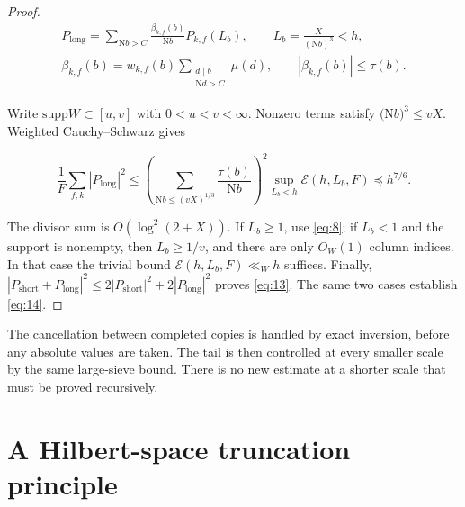 \documentclass[reqno,a4paper,11pt]{amsart}
\begin{document}
\begin{proof}
\begin{equation}\label{eq:16}
\begin{gathered} {P}_{\mathrm{long}}=\sum _{\mathrm{N}b>C} \frac{{\beta }_{k,f}\left( b\right) }{\mathrm{N}b}{P}_{k,f}\left( {L}_{b}\right) ,\quad \quad {L}_{b}=\frac{X}{{\left( \mathrm{N}b\right) }^{3}}<h, \\ {\beta }_{k,f}\left( b\right) ={w}_{k,f}\left( b\right) \sum _{\begin{gathered} d\mid b \\ \mathrm{N}d>C \end{gathered}} \mu \left( d\right) ,\quad \quad \left| {\beta }_{k,f}\left( b\right) \right| \le \tau \left( b\right) . \end{gathered}
\end{equation}

Write $\mathrm{supp}W\subset [u,v]$ with $0<u<v<\infty $. Nonzero terms satisfy $(\mathrm{N}b{)}^{3}\le vX$. Weighted Cauchy--Schwarz gives

\begin{equation}\label{eq:17}
\frac{1}{F}\sum _{f,k} {\left| {P}_{\mathrm{long}}\right| }^{2}\le {\left( \sum _{\mathrm{N}b\le {\left( vX\right) }^{1/3}} \frac{\tau \left( b\right) }{\mathrm{N}b}\right) }^{2}{\sup }_{{L}_{b}<h}\mathcal{E}\left( h,{L}_{b},F\right) \preccurlyeq {h}^{7/6}.
\end{equation}

The divisor sum is $O\left( {\log }^{2}\left( 2+X\right) \right) $. If ${L}_{b}\ge 1$, use \eqref{eq:8}; if ${L}_{b}<1$ and the support is nonempty, then ${L}_{b}\ge 1/v$, and there are only ${O}_{W}\left( 1\right) $ column indices. In that case the trivial bound $\mathcal{E}\left( h,{L}_{b},F\right) {\ll }_{W}h$ suffices. Finally, ${\left| {P}_{\mathrm{short}}+{P}_{\mathrm{long}}\right| }^{2}\le 2{\left| {P}_{\mathrm{short}}\right| }^{2}+2{\left| {P}_{\mathrm{long}}\right| }^{2}$ proves \eqref{eq:13}. The same two cases establish \eqref{eq:14}.

\end{proof}

The cancellation between completed copies is handled by exact inversion, before any absolute values are taken. The tail is then controlled at every smaller scale by the same large-sieve bound. There is no new estimate at a shorter scale that must be proved recursively.

\section{A Hilbert-space truncation principle}
\end{document}
